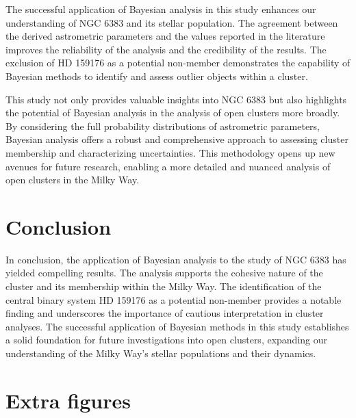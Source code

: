 \documentclass[fleqn,usenatbib,usedcolumn,useAMS]{mnras}
\begin{document}
The successful application of Bayesian analysis in this study enhances our understanding of NGC 6383 and its stellar population. The agreement between the derived astrometric parameters and the values reported in the literature improves the reliability of the analysis and the credibility of the results. The exclusion of HD 159176 as a potential non-member demonstrates the capability of Bayesian methods to identify and assess outlier objects within a cluster.

This study not only provides valuable insights into NGC 6383 but also highlights the potential of Bayesian analysis in the analysis of open clusters more broadly. By considering the full probability distributions of astrometric parameters, Bayesian analysis offers a robust and comprehensive approach to assessing cluster membership and characterizing uncertainties. This methodology opens up new avenues for future research, enabling a more detailed and nuanced analysis of open clusters in the Milky Way.

\section{Conclusion}

In conclusion, the application of Bayesian analysis to the study of NGC 6383 has yielded compelling results. The analysis supports the cohesive nature of the cluster and its membership within the Milky Way. The identification of the central binary system HD 159176 as a potential non-member provides a notable finding and underscores the importance of cautious interpretation in cluster analyses. The successful application of Bayesian methods in this study establishes a solid foundation for future investigations into open clusters, expanding our understanding of the Milky Way's stellar populations and their dynamics.



\appendix

\section{Extra figures}
\end{document}
